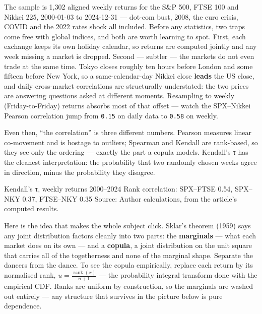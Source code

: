 \documentclass{pyportfolios-note}
\begin{document}
The sample is 1,302 aligned weekly returns for the S\&P 500, FTSE 100 and Nikkei
225, 2000-01-03 to 2024-12-31 — dot-com bust, 2008, the euro crisis, COVID and
the 2022 rates shock all included. Before any statistics, two traps come free
with global indices, and both are worth learning to spot. First, each exchange
keeps its own holiday calendar, so returns are computed jointly and any week
missing a market is dropped. Second — subtler — the markets do not even trade at
the same time. Tokyo closes roughly ten hours before London and some fifteen
before New York, so a same-calendar-day Nikkei close \textbf{leads} the US close,
and daily cross-market correlations are structurally understated: the two prices
are answering questions asked at different moments. Resampling to weekly
(Friday-to-Friday) returns absorbs most of that offset — watch the SPX–Nikkei
Pearson correlation jump from \texttt{0.15} on daily data to \texttt{0.58} on
weekly.

Even then, ``the correlation'' is three different numbers. Pearson measures
linear co-movement and is hostage to outliers; Spearman and Kendall are
rank-based, so they see only the ordering — exactly the part a copula models.
Kendall's τ has the cleanest interpretation: the probability that two randomly
chosen weeks agree in direction, minus the probability they disagree.

  {Kendall's τ, weekly returns 2000–2024}
  {Rank correlation: SPX–FTSE 0.54, SPX–NKY 0.37, FTSE–NKY 0.35}
  {Source: Author calculations, from the article's computed results.}


\noteneedroom{190bp}

Here is the idea that makes the whole subject click. Sklar's theorem (1959) says
any joint distribution factors cleanly into two parts: the \textbf{marginals} —
what each market does on its own — and a \textbf{copula}, a joint distribution on
the unit square that carries all of the togetherness and none of the marginal
shape. Separate the dancers from the dance. To see the copula empirically,
replace each return by its normalised rank,
$u = \frac{\operatorname{rank}(x)}{n + 1}$ — the probability integral transform
done with the empirical CDF. Ranks are uniform by construction, so the marginals
are washed out entirely — any structure that survives in the picture below is
pure dependence.
\end{document}
